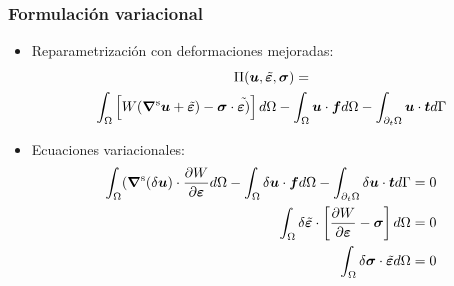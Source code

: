 \documentclass[handout]{beamer}
\begin{document}
\begin{frame}
\frametitle{Formulación variacional}
\begin{itemize}
\item Reparametrización con deformaciones mejoradas:
\begin{multline*}
\Pi(\bm{u},\tilde{\bm{\varepsilon}},\bm{\sigma})= \\
\int_{\Omega} \left[
W(\bm{\nabla}^{\rm s} \bm{u}+\tilde{\bm{\varepsilon}})-\bm{\sigma}
\cdot \tilde{\bm{\varepsilon})}
\right] d\Omega
-\int_{\Omega} \bm{u} \cdot \bm{f} d \Omega-
\int_{\partial_{t} \Omega} \bm{u} \cdot \bm{t} d \Gamma
\end{multline*}
\item Ecuaciones variacionales:
\begin{align*}
\int_{\Omega} 
(\bm{\nabla}^{\rm s} (\delta \bm{u})
\cdot  \frac{\partial W}{\partial \bm{\varepsilon}}d \Omega
-\int_{\Omega} \delta \bm{u} \cdot \bm{f} d \Omega-
\int_{\partial_{t} \Omega} \delta \bm{u} \cdot \bm{t} d \Gamma&=0 \\
\int_{\Omega} 
\delta \tilde{\bm{\varepsilon}} 
\cdot  \left[
\frac{\partial W}{\partial \bm{\varepsilon}}-\bm{\sigma} \right]
d\Omega&=0 \\
\int_{\Omega} 
\delta \bm{\sigma}
\cdot \tilde{\bm{\varepsilon}}
d\Omega&= 0
\end{align*}
\end{itemize}
\end{frame}
\end{document}
